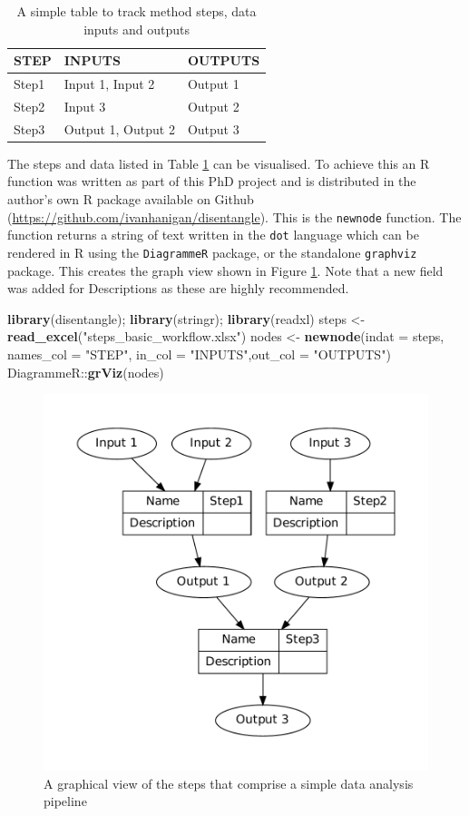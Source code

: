 \documentclass[11pt,a4paper]{article}
\newenvironment{Shaded}{\begin{snugshade}}{\end{snugshade}}
\newcommand{\KeywordTok}[1]{\textcolor[rgb]{0.13,0.29,0.53}{\textbf{{#1}}}}
\newcommand{\DataTypeTok}[1]{\textcolor[rgb]{0.13,0.29,0.53}{{#1}}}
\newcommand{\StringTok}[1]{\textcolor[rgb]{0.31,0.60,0.02}{{#1}}}
\newcommand{\NormalTok}[1]{{#1}}
\begin{document}
\begin{table}[!h]
\centering
\caption{A simple table to track method steps, data inputs and outputs} 
\label{tab:TableBasic}
\begin{tabular}{p{.6in}p{2in}p{2in}}
  \hline
STEP & INPUTS & OUTPUTS \\ 
  \hline
Step1 & Input 1, Input 2 & Output 1 \\ 
  Step2 & Input 3 & Output 2 \\ 
  Step3 & Output 1, Output 2 & Output 3 \\ 
   \hline
\end{tabular}
\end{table}

The steps and data listed in Table \ref{tab:TableBasic} can be
visualised. To achieve this an R function was written as part of this
PhD project and is distributed in the author's own R package available
on Github (\url{https://github.com/ivanhanigan/disentangle}). This is
the \texttt{newnode} function. The function returns a string of text
written in the \texttt{dot} language which can be rendered in R using
the \texttt{DiagrammeR} package, or the standalone \texttt{graphviz}
package. This creates the graph view shown in Figure \ref{fig:FigBasic}.
Note that a new field was added for Descriptions as these are highly
recommended.

\begin{Shaded}
\begin{Highlighting}[]
\KeywordTok{library}\NormalTok{(disentangle); }\KeywordTok{library}\NormalTok{(stringr); }\KeywordTok{library}\NormalTok{(readxl)}
\NormalTok{steps <-}\StringTok{ }\KeywordTok{read_excel}\NormalTok{(}\StringTok{"steps_basic_workflow.xlsx"}\NormalTok{)}
\NormalTok{nodes <-}\StringTok{ }\KeywordTok{newnode}\NormalTok{(}\DataTypeTok{indat =} \NormalTok{steps, }\DataTypeTok{names_col =} \StringTok{"STEP"}\NormalTok{,}
                 \DataTypeTok{in_col =} \StringTok{"INPUTS"}\NormalTok{,}\DataTypeTok{out_col =} \StringTok{"OUTPUTS"}\NormalTok{)}
\NormalTok{DiagrammeR::}\KeywordTok{grViz}\NormalTok{(nodes)}
\end{Highlighting}
\end{Shaded}

\begin{figure}[!ht]
\centering
\includegraphics[width=.5\textwidth]{images/fig-basic.pdf}
\caption{A graphical view of the steps that comprise a simple data analysis pipeline}
\label{fig:FigBasic}
\end{figure}
\end{document}
